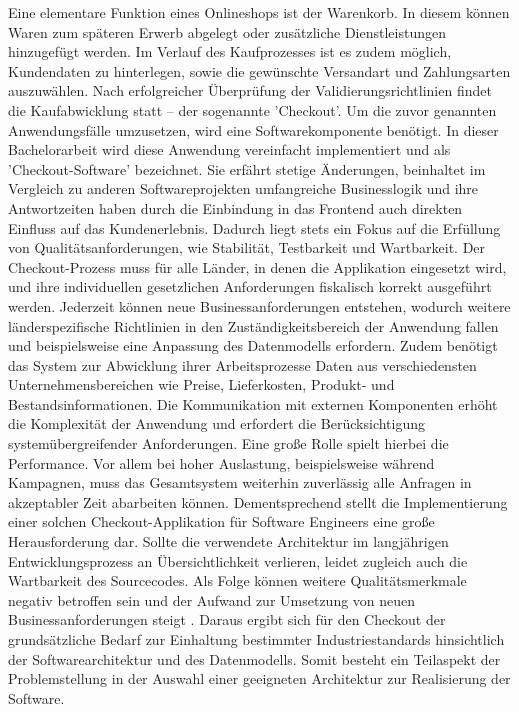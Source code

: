 Eine elementare Funktion eines Onlineshops ist der Warenkorb. In diesem können Waren zum späteren Erwerb abgelegt oder zusätzliche Dienstleistungen hinzugefügt werden. Im Verlauf des Kaufprozesses ist es zudem möglich, Kundendaten zu hinterlegen, sowie die gewünschte Versandart und Zahlungsarten auszuwählen. Nach erfolgreicher Überprüfung der Validierungsrichtlinien findet die Kaufabwicklung statt – der sogenannte 'Checkout'. Um die zuvor genannten Anwendungsfälle umzusetzen, wird eine Softwarekomponente benötigt. In dieser Bachelorarbeit wird diese Anwendung vereinfacht implementiert und als 'Checkout-Software' bezeichnet. Sie erfährt stetige Änderungen, beinhaltet im Vergleich zu anderen Softwareprojekten umfangreiche Businesslogik und ihre Antwortzeiten haben durch die Einbindung in das Frontend auch direkten Einfluss auf das Kundenerlebnis. Dadurch liegt stets ein Fokus auf die Erfüllung von Qualitätsanforderungen, wie Stabilität, Testbarkeit und Wartbarkeit. Der Checkout-Prozess muss für alle Länder, in denen die Applikation eingesetzt wird, und ihre individuellen gesetzlichen Anforderungen fiskalisch korrekt ausgeführt werden. Jederzeit können neue Businessanforderungen entstehen, wodurch weitere länderspezifische Richtlinien in den Zuständigkeitsbereich der Anwendung fallen und beispielsweise eine Anpassung des Datenmodells erfordern. Zudem benötigt das System zur Abwicklung ihrer Arbeitsprozesse Daten aus verschiedensten Unternehmensbereichen wie Preise, Lieferkosten, Produkt- und Bestandsinformationen. Die Kommunikation mit externen Komponenten erhöht die Komplexität der Anwendung und erfordert die Berücksichtigung systemübergreifender Anforderungen. Eine große Rolle spielt hierbei die Performance. Vor allem bei hoher Auslastung, beispielsweise während Kampagnen, muss das Gesamtsystem weiterhin zuverlässig alle Anfragen in akzeptabler Zeit abarbeiten können. Dementsprechend stellt die Implementierung einer solchen Checkout-Applikation für Software Engineers eine große Herausforderung dar. Sollte die verwendete Architektur im langjährigen Entwicklungsprozess an Übersichtlichkeit verlieren, leidet zugleich auch die Wartbarkeit des Sourcecodes. Als Folge können weitere Qualitätsmerkmale negativ betroffen sein und der Aufwand zur Umsetzung von neuen Businessanforderungen steigt \cite[S. 3f.]{Pigoski.2001}. Daraus ergibt sich für den Checkout der grundsätzliche Bedarf zur Einhaltung bestimmter Industriestandards hinsichtlich der Softwarearchitektur und des Datenmodells. Somit besteht ein Teilaspekt der Problemstellung in der Auswahl einer geeigneten Architektur zur Realisierung der Software. 

